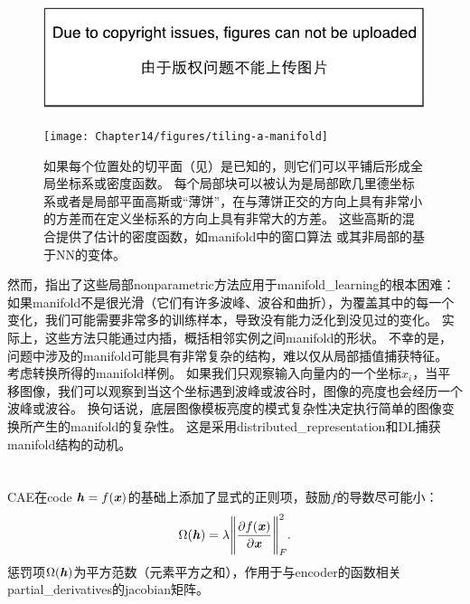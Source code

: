 \begin{figure}[!htb]
\ifOpenSource
\centerline{\includegraphics{figure.pdf}}
\else
\centerline{\texttt{[image: Chapter14/figures/tiling-a-manifold]}}
\fi
\caption{如果每个位置处的切平面（见）是已知的，则它们可以平铺后形成全局坐标系或密度函数。
每个局部块可以被认为是局部欧几里德坐标系或者是局部平面高斯或``薄饼''，在与薄饼正交的方向上具有非常小的方差而在定义坐标系的方向上具有非常大的方差。
这些高斯的混合提供了估计的密度函数，如\gls{manifold}中的窗口算法\citep{Vincent-Bengio-2003-short} 或其非局部的基于\gls{NN}的变体\citep{Bengio-Larochelle-NLMP-NIPS-2006-short}。
}
\label{fig:chap14_tiling-a-manifold}
\end{figure}

然而，\citet{Bengio+Monperrus-2005}指出了这些局部\gls{nonparametric}方法应用于\gls{manifold_learning}的根本困难：如果\gls{manifold}不是很光滑（它们有许多波峰、波谷和曲折），为覆盖其中的每一个变化，我们可能需要非常多的训练样本，导致没有能力泛化到没见过的变化。
实际上，这些方法只能通过内插，概括相邻实例之间\gls{manifold}的形状。
不幸的是，问题中涉及的\gls{manifold}可能具有非常复杂的结构，难以仅从局部插值捕获特征。
考虑转换所得的\gls{manifold}样例。
如果我们只观察输入向量内的一个坐标$x_i$，当平移图像，我们可以观察到当这个坐标遇到波峰或波谷时，图像的亮度也会经历一个波峰或波谷。
换句话说，底层图像模板亮度的模式复杂性决定执行简单的图像变换所产生的\gls{manifold}的复杂性。
这是采用\gls{distributed_representation}和\gls{DL}捕获\gls{manifold}结构的动机。


\section{}
\label{sec:contractive_autoencoders}
\gls{CAE}\citep{Rifai+al-2011-small,Salah+al-2011-small}在\gls{code} $\boldsymbol{\mathit{h}} = f(\boldsymbol{\mathit{x}})$的基础上添加了显式的正则项，鼓励$f$的导数尽可能小：
\begin{align}
 \Omega(\boldsymbol{\mathit{h}}) = \lambda \Bigg\| \frac{\partial f(\boldsymbol{\mathit{x}})}{\partial \boldsymbol{\mathit{x}}} \Bigg\|_F^2 .
\end{align}
惩罚项$\Omega(\boldsymbol{\mathit{h}})$为平方范数（元素平方之和），作用于与\gls{encoder}的函数相关\gls{partial_derivatives}的\gls{jacobian}矩阵。


